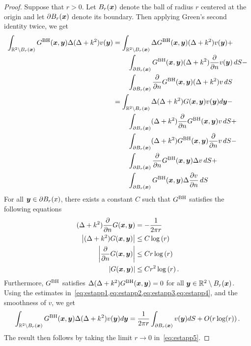 \begin{proof}
Suppose that $r>0$. 
Let $B_{r}({\boldsymbol x})$ denote the ball of radius $r$ centered at the origin
and let $\partial B_{r}({\boldsymbol x})$ denote its boundary.
Then applying Green's second identity twice, we get 
\begin{align}
\int_{\mathbb{R}^{2} \setminus B_{r}({\boldsymbol x})} G^{\textrm{BH}}({\boldsymbol x},{\boldsymbol y}) \Delta (\Delta +k^{2}) v({\boldsymbol y})
&=
\int_{\mathbb{R}^{2} \setminus B_{r}({\boldsymbol x})} \Delta G^{\textrm{BH}} ({\boldsymbol x},{\boldsymbol y}) (\Delta + k^2) 
v({\boldsymbol y}) + \\
& \hspace{5ex}\int_{\partial B_{r}({\boldsymbol x})} G^{\textrm{BH}}({\boldsymbol x},{\boldsymbol y}) (\Delta + k^{2})
\frac{\partial}{\partial n}v({\boldsymbol y}) \, dS - \\
& \hspace{5ex}\int_{\partial B_{r}({\boldsymbol x})} \frac{\partial }{\partial n} G^{\textrm{BH}}({\boldsymbol x},{\boldsymbol y}) 
(\Delta + k^2) v \, dS \\
&= \int_{\mathbb{R}^{2} \setminus B_{r}({\boldsymbol x})} \Delta (\Delta + k^2)G({\boldsymbol x},{\boldsymbol y}) v({\boldsymbol y})
d{\boldsymbol y}  - \nonumber \\
& \hspace{5ex}\int_{\partial B_{r}({\boldsymbol x})} (\Delta + k^2) 
\frac{\partial }{\partial n} G^{\textrm{BH}}({\boldsymbol x},{\boldsymbol y}) v \, dS + \nonumber\\
& \hspace{5ex}\int_{\partial B_{r}({\boldsymbol x})} (\Delta + k^2) 
G^{\textrm{BH}}({\boldsymbol x},{\boldsymbol y}) \frac{\partial}{\partial n}v \, dS - \nonumber \\
& \hspace{5ex}\int_{\partial B_{r}({\boldsymbol x})}  
\frac{\partial }{\partial n} G^{\textrm{BH}}({\boldsymbol x},{\boldsymbol y}) \Delta v\, dS + \\
& \hspace{5ex}
\int_{\partial B_{r}({\boldsymbol x})} G^{\textrm{BH}}({\boldsymbol x},{\boldsymbol y}) \Delta \frac{\partial v}{\partial n}
\, dS \nonumber
\end{align}
For all ${\boldsymbol y} \in \partial B_{r}(x)$, there exists a constant $C$ such that
$G^{\textrm{BH}}$ satisfies the following equations
\begin{align}
(\Delta + k^2) \frac{\partial }{\partial n} G({\boldsymbol x},{\boldsymbol y}) &= 
-\frac{1}{2\pi r} \label{eq:estapp1}\\
\left|(\Delta + k^2) G({\boldsymbol x},{\boldsymbol y}) \right| &\leq C \log{(r)} \label{eq:estapp2}\\
\left|\frac{\partial }{\partial n} G({\boldsymbol x},{\boldsymbol y}) \right| &\leq C r\log{(r)} 
\label{eq:estapp3}\\
\left| G({\boldsymbol x},{\boldsymbol y}) \right| &\leq C r^{2} \log{(r)} \label{eq:estapp4}\, .
\end{align}
Furthermore, $G^{\textrm{BH}}$ satisfies $\Delta (\Delta + k^2) G^{\textrm{BH}}({\boldsymbol x},{\boldsymbol y}) = 0$
for all ${\boldsymbol y} \in \mathbb{R}^{2} \setminus B_{r}({\boldsymbol x})$.
Using the estimates in~\cref{eq:estapp1,eq:estapp2,eq:estapp3,eq:estapp4}, 
and the smoothness of $v$, we get
\begin{equation}
\int_{\mathbb{R}^{2} \setminus B_{r}({\boldsymbol x})} G^{\textrm{BH}}({\boldsymbol x},{\boldsymbol y}) \Delta (\Delta + k^2) v({\boldsymbol y}) 
d {\boldsymbol y} = \frac{1}{2\pi r} \int_{\partial B_{r}({\boldsymbol x})} v({\boldsymbol y}) dS + 
O(r \log(r)) \, \label{eq:estapp5}.
\end{equation}
The result then follows by taking the limit $r\to 0$ in~\cref{eq:estapp5}. 
\end{proof}
\label{sec:farkproof}

